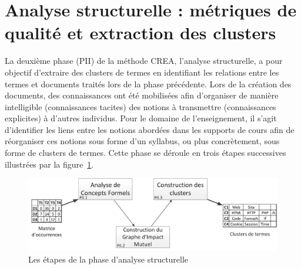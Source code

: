 \section{Analyse structurelle : métriques de qualité et extraction des clusters}
\label{subsection:CREA:PII-AnalyseStructurelle}

La deuxième phase (PII) de la méthode CREA, l'analyse structurelle, a pour objectif d'extraire des clusters de termes en identifiant les relations entre les termes et documents traités lors de la phase précédente.
Lors de la création des documents, des connaissances ont été mobilisées afin d'organiser de manière intelligible (connaissances tacites) des notions à transmettre (connaissances explicites) à d'autres individus.
Pour le domaine de l'enseignement, il s'agit d'identifier les liens entre les notions abordées dans les supports de cours afin de réorganiser ces notions sous forme d'un syllabus, ou plus concrètement, sous forme de clusters de termes.
Cette phase se déroule en trois étapes successives illustrées par la figure~\ref{figure:3-II-AnalyseStructurelle}.


\begin{figure}[ht]
\centering
\centerline{  %
\includegraphics[scale=0.6]{3-Methode-CREA/images/schema_analyse_structurelle_ESCALIER.png}
}
\caption{Les étapes de la phase d'analyse structurelle}
\label{figure:3-II-AnalyseStructurelle}
\end{figure}

